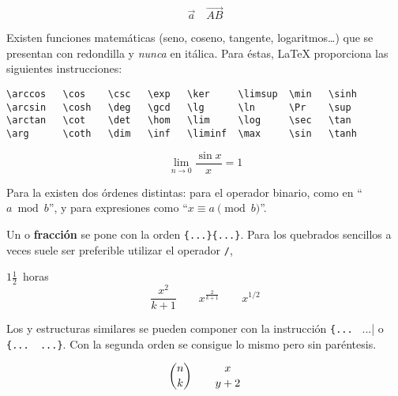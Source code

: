 \begin{example}
\begin{displaymath}
\vec a\quad\overrightarrow{AB}
\end{displaymath}
\end{example}

Existen    funciones    matemáticas     (seno,    coseno,    tangente,
logaritmos\ldots)  que  se  presentan con  redondilla  y  \emph{nunca}
en   itálica.  Para   éstas,  \LaTeX{}   proporciona  las   siguientes
instrucciones: 

\begin{verbatim}
\arccos   \cos    \csc   \exp   \ker     \limsup  \min   \sinh
\arcsin   \cosh   \deg   \gcd   \lg      \ln      \Pr    \sup
\arctan   \cot    \det   \hom   \lim     \log     \sec   \tan
\arg      \coth   \dim   \inf   \liminf  \max     \sin   \tanh
\end{verbatim}

\begin{example}
\[\lim_{n \rightarrow 0}
\frac{\sin x}{x}=1\]
\end{example}

Para la   existen dos  órdenes distintas: 
para el  operador binario, como en  ``$a \bmod b$'', y   para
expresiones como ``$x\equiv a \pmod{b}$''.

Un                       \textbf{}                      o
\textbf{fracción}   se  pone   con  la
orden  \verb|{...}{...}|.  Para  los  quebrados  sencillos  a
veces   suele   ser   preferible  utilizar   el   operador   \verb|/|,

\begin{example}
$1\frac{1}{2}$~horas
\begin{displaymath}
\frac{ x^2 }{ k+1 }\qquad
x^{ \frac{2}{k+1} }\qquad
x^{ 1/2 }
\end{displaymath}
\end{example}

Los \textbf{} y estructuras similares
se pueden componer con  la instrucción \verb|{... |%
{...}| o  \verb|{... |\verb| ...}|.  Con la segunda  orden se
consigue lo mismo pero sin paréntesis.

\begin{example}
\begin{displaymath}
{n \choose k}\qquad {x \atop y+2}
\end{displaymath}
\end{example}
 
